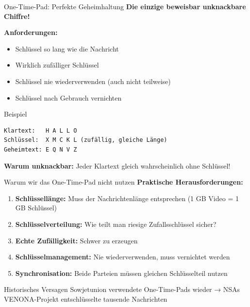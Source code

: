 \documentclass[handout]{beamer}
\begin{document}
\begin{frame}[fragile]{One-Time-Pad: Perfekte Geheimhaltung}
\textbf{Die einzige beweisbar unknackbare Chiffre!}

\vspace{0.3cm}
\textbf{Anforderungen:}
\begin{itemize}
    \item Schlüssel so lang wie die Nachricht
    \item Wirklich zufälliger Schlüssel
    \item Schlüssel nie wiederverwenden (auch nicht teilweise)
    \item Schlüssel nach Gebrauch vernichten
\end{itemize}
\pause
\vspace{0.3cm}
\begin{exampleblock}{Beispiel}
\begin{verbatim}
Klartext:   H A L L O
Schlüssel:  X M C K L (zufällig, gleiche Länge)
Geheimtext: E Q N V Z
\end{verbatim}
\end{exampleblock}

\textbf{Warum unknackbar:} Jeder Klartext gleich wahrscheinlich ohne Schlüssel!
\end{frame}

\begin{frame}{Warum wir das One-Time-Pad nicht nutzen}
\textbf{Praktische Herausforderungen:}

\begin{enumerate}
    \item \textbf{Schlüssellänge:} Muss der Nachrichtenlänge entsprechen (1 GB Video = 1 GB Schlüssel)
    \item \textbf{Schlüsselverteilung:} Wie teilt man riesige Zufallsschlüssel sicher?
    \item \textbf{Echte Zufälligkeit:} Schwer zu erzeugen
    \item \textbf{Schlüsselmanagement:} Nie wiederverwenden, muss vernichtet werden
    \item \textbf{Synchronisation:} Beide Parteien müssen gleichen Schlüsselteil nutzen
\end{enumerate}
\pause
\vspace{0.3cm}
\begin{alertblock}{Historisches Versagen}
Sowjetunion verwendete One-Time-Pads wieder → NSAs VENONA-Projekt entschlüsselte tausende Nachrichten
\end{alertblock}
\end{frame}
\end{document}
